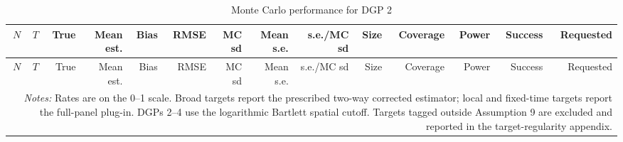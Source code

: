 \begingroup
\small
\begin{longtable}{rrrrrrrrrrrrrr}
\caption{Monte Carlo performance for DGP 2}\label{tab:mc-dgp2}\\
\toprule
$N$ & $T$ & True & Mean est. & Bias & RMSE & MC sd & Mean s.e. & s.e./MC sd & Size & Coverage & Power & Success & Requested \\
\midrule
\endfirsthead
\toprule
$N$ & $T$ & True & Mean est. & Bias & RMSE & MC sd & Mean s.e. & s.e./MC sd & Size & Coverage & Power & Success & Requested \\
\midrule
\endhead
\bottomrule
\multicolumn{14}{p{0.96\linewidth}}{\footnotesize \textit{Notes:} Rates are on the 0--1 scale. Broad targets report the prescribed two-way corrected estimator; local and fixed-time targets report the full-panel plug-in. DGPs 2--4 use the logarithmic Bartlett spatial cutoff. Targets tagged outside Assumption 9 are excluded and reported in the target-regularity appendix.} \\
\end{longtable}
\endgroup
